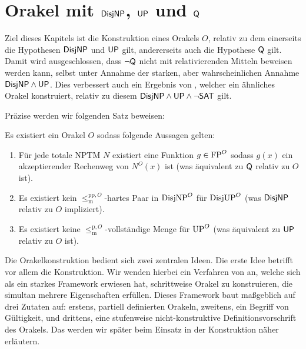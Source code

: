 \chapter{Orakel mit $\mathsf{DisjNP}$, $\mathsf{UP}$ und $\mathsf{Q}$}\label{chap:orakel}

Ziel dieses Kapitels ist die Konstruktion eines Orakels $O$, relativ zu dem einerseits die Hypothesen $\mathsf{DisjNP}$ und $\mathsf{UP}$ gilt, andererseits auch die Hypothese $\mathsf{Q}$ gilt.
Damit wird ausgeschlossen, dass $\neg\mathsf{Q}$ nicht mit relativierenden Mitteln beweisen werden kann, selbst unter Annahme der starken, aber wahrscheinlichen Annahme $\mathsf{DisjNP}\land\mathsf{UP}$.
Dies verbessert auch ein Ergebnis von \textcite[Cor.~3.3]{dose_oracle_2020}, welcher ein ähnliches Orakel konstruiert, relativ zu diesem $\mathsf{DisjNP}\land\mathsf{UP}\land\neg\mathsf{SAT}$ gilt.

Präzise werden wir folgenden Satz beweisen:

\begin{theorem}\label{thm:myoracle}
    Es existiert ein Orakel $O$ sodass folgende Aussagen gelten:
    \begin{enumerate}
        \item Für jede totale NPTM $N$ existiert eine Funktion $g\in\mathrm{FP}^O$ sodass $g(x)$ ein akzeptierender Rechenweg von $N^O(x)$ ist (was äquivalent zu $\mathsf{Q}$ relativ zu $O$ ist).
        \item Es existiert kein $\leq_\mathrm{m}^{\mathrm{pp},O}$-hartes Paar in $\mathrm{DisjNP}^O$ für $\mathrm{DisjUP}^O$ (was $\mathsf{DisjNP}$ relativ zu $O$ impliziert).
        \item Es existiert keine $\leq_\mathrm{m}^{\mathrm{p},O}$-vollständige Menge für $\mathrm{UP}^O$ (was äquivalent zu $\mathsf{UP}$ relativ zu $O$ ist).
    \end{enumerate}
\end{theorem}

Die Orakelkonstruktion bedient sich zwei zentralen Ideen. 
Die erste Idee betrifft vor allem die Konstruktion. 
Wir wenden hierbei ein Verfahren von \textcite{dose_np-completeness_2019} an, welche sich als ein starkes Framework erwiesen hat, schrittweise Orakel zu konstruieren, die simultan mehrere Eigenschaften erfüllen. Dieses Framework baut maßgeblich auf drei Zutaten auf: erstens, partiell definierten Orakeln, zweitens, ein Begriff von Gültigkeit, und drittens, eine stufenweise nicht-konstruktive Definitionsvorschrift des Orakels.
Das werden wir später beim Einsatz in der Konstruktion näher erläutern.

